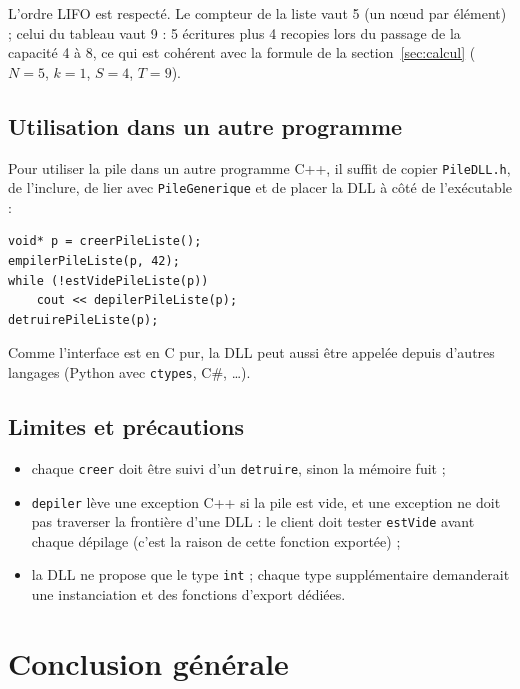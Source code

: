 \documentclass[11pt,a4paper]{article}
\begin{document}
L'ordre LIFO est respecté. Le compteur de la liste vaut 5 (un nœud par élément) ; celui du tableau vaut 9 : 5 écritures plus 4 recopies lors du passage de la capacité 4 à 8, ce qui est cohérent avec la formule de la section~\ref{sec:calcul} ($N=5$, $k=1$, $S=4$, $T=9$).

\subsection{Utilisation dans un autre programme}

Pour utiliser la pile dans un autre programme C++, il suffit de copier \texttt{PileDLL.h}, de l'inclure, de lier avec \texttt{PileGenerique} et de placer la DLL à côté de l'exécutable :

\begin{lstlisting}
void* p = creerPileListe();
empilerPileListe(p, 42);
while (!estVidePileListe(p))
    cout << depilerPileListe(p);
detruirePileListe(p);
\end{lstlisting}

Comme l'interface est en C pur, la DLL peut aussi être appelée depuis d'autres langages (Python avec \texttt{ctypes}, C\#, \dots).

\subsection{Limites et précautions}

\begin{itemize}[nosep]
    \item chaque \texttt{creer} doit être suivi d'un \texttt{detruire}, sinon la mémoire fuit ;
    \item \texttt{depiler} lève une exception C++ si la pile est vide, et une exception ne doit pas traverser la frontière d'une DLL : le client doit tester \texttt{estVide} avant chaque dépilage (c'est la raison de cette fonction exportée) ;
    \item la DLL ne propose que le type \texttt{int} ; chaque type supplémentaire demanderait une instanciation et des fonctions d'export dédiées.
\end{itemize}

\section{Conclusion générale}
\end{document}
